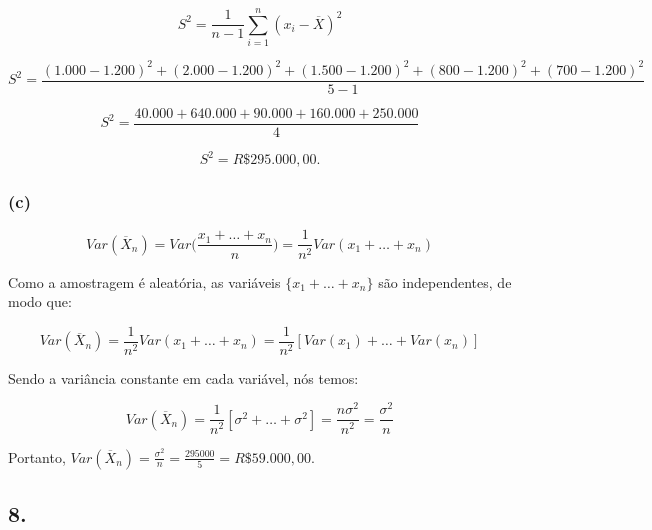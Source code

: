 \documentclass[hidelinks,11pt]{book}
\theoremstyle{definition}
\begin{document}
\begin{displaymath}
	S^2 = \frac{1}{n-1} \sum_{i=1}^{n} (x_i - \overline{X})^2
\end{displaymath}

\begin{displaymath}
	S^2 = \frac{(1.000 - 1.200)^2 + (2.000 - 1.200)^2 + (1.500 - 1.200)^2 + (800 - 1.200)^2 + (700 - 1.200)^2}{5-1}
\end{displaymath}



\begin{displaymath}
	S^2 = \frac{40.000 + 640.000 + 90.000 + 160.000 + 250.000}{4}
\end{displaymath}

\begin{displaymath}
	S^2 = R\$295.000,00.
\end{displaymath}

\subsubsection{(c)}


\begin{displaymath}
	Var(\overline{X}_n) = Var\Bigg(\frac{x_1 + \dots + x_n}{n}\Bigg) = \frac{1}{n^2}Var(x_1 + \dots + x_n)
\end{displaymath}





Como a amostragem é aleatória, as variáveis $\{x_1 + \dots + x_n\}$ são independentes, de modo que:


\begin{displaymath}
	Var(\overline{X}_n) =  \frac{1}{n^2}Var(x_1 + \dots + x_n) = \frac{1}{n^2}[Var(x_1) + \dots + Var(x_n)]
\end{displaymath}

Sendo a variância constante em cada variável, nós temos:


\begin{displaymath}
	Var(\overline{X}_n) =  \frac{1}{n^2}[\sigma^2 + \dots + \sigma^2] = \frac{n\sigma^2}{n^2} = \frac{\sigma^2}{n}
\end{displaymath}

Portanto, $Var(\overline{X}_n) = \frac{\sigma^2}{n} = \frac{295000}{5} = R\$59.000,00.$






	\subsection*{8.}
\end{document}
